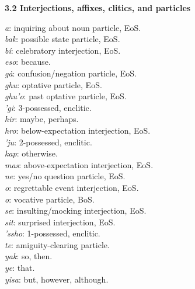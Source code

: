 \documentclass{article}[10pt]
\begin{document}
{\bf 3.2 Interjections, affixes, clitics, and particles}
\begin{multicols}{2}
\noindent
\emph{a}: inquiring about noun particle, EoS.\\
\emph{bak}: possible state particle, EoS.\\
\emph{b\'{i}}: celebratory interjection, EoS.\\
\emph{eso}: because.\\
\emph{g\.{a}}: confusion/negation particle, EoS.\\
\emph{ghu}: optative particle, EoS.\\
\emph{ghu'o}: past optative particle, EoS.\\
\emph{'gi}: 3-possessed, enclitic.\\
\emph{hir}: maybe, perhaps.\\
\emph{hro}: below-expectation interjection, EoS.\\
\emph{'ju}: 2-possessed, enclitic.\\
\emph{kap}: otherwise.\\
\emph{mas}: above-expectation interjection, EoS.\\
\emph{ne}: yes/no question particle, EoS.\\
\emph{o}: regrettable event interjection, EoS.\\
\emph{o}: vocative particle, BoS.\\
\emph{se}: insulting/mocking interjection, EoS.\\
\emph{sit}: surprised interjection, EoS.\\
\emph{'ssho}: 1-possessed, enclitic.\\
\emph{te}: amiguity-clearing particle.\\
\emph{yak}: so, then.\\
\emph{ye}: that.\\
\emph{yisa}: but, however, although.\\
\end{multicols}
\end{document}

